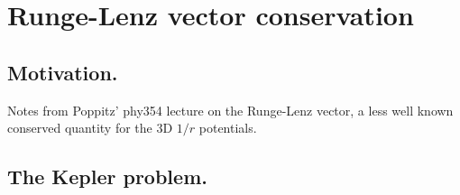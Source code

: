 
%

\chapter{Runge-Lenz vector conservation}
\label{chap:RungeLenz}
{}
\date{Feb 11, 2012}

\beginArtWithToc

\section{Motivation.}

Notes from Poppitz' phy354 lecture on the Runge-Lenz vector, a less well known conserved quantity for the 3D $1/r$ potentials.

\section{The Kepler problem.}

\EndNoBibArticle
